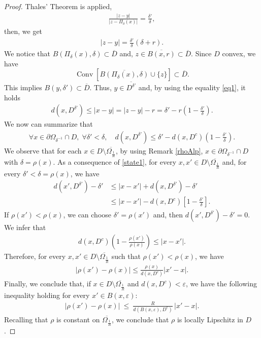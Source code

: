 \documentclass[reqno,11pt]{amsart}
\theoremstyle{definition}
\numberwithin{equation}{section}
\def\e{\varepsilon}
\def\ov{\overline}
\DeclareMathOperator{\conv}{Conv}
\newcommand{\1}{{{\bf 1}\kern-0,28em\rm l}}
\def\proj{\Pi}
\begin{document}
\begin{proof}
\noindent
Thales' Theorem is applied,
\begin{align*}
\frac{|z-y|}{|z- \proj_\delta (x)|}=\frac{\delta'}{\delta},
\end{align*}
then, we get 
\begin{align}
|z-y|=\frac{\delta'}{\delta} (\delta+r). \label{eq1}
\end{align}
We notice that $B(\proj_\delta (x),\delta) \subset \ov D$ and, $z\in \ov{B(x,r)} \subset \ov D$. Since $D$ convex,   we have 
$$\conv\left[\ov{B(\proj_\delta (x),\delta)}\cup\{z\} \right] \subset \ov D.$$
This implies $B(y,\delta')\subset \ov D$. Thus, $ y\in \ov{D^{\delta'}}$ and, by using the equality \eqref{eq1}, it holds
\begin{align*}
d(x,D^{\delta'})\le |x-y|=|z-y|-r=\delta'-r(1-\frac{\delta'}{\delta}).
\end{align*}
We now can summarize that 
\begin{align}
\forall x\in \partial\Omega_{\delta^{-1}}\cap D,\; \forall \delta'<\delta,\quad
d(x,D^{\delta'})\le \delta' - d(x, D^c)(1-\frac{\delta'}{\delta}).\label{state1}
\end{align}
We observe that for each $x\in D \setminus \ov{\Omega_{\frac 1R}}$, by using Remark \ref{rhoAlp}, $x\in \partial\Omega_{\delta^{-1}}\cap D$ with $\delta=\rho(x)$.
As a consequence of  \eqref{state1}, for every $x,x'\in D \setminus \ov{\Omega_{\frac 1R}}$ and, for every
$\delta' <\delta =\rho(x)$, we have
\begin{align*}
d(x',D^{\delta'})-\delta' &\le |x-x'| + d(x,D^{\delta'}) - \delta' \\
&\le |x-x'| - d(x, D^c) \left[ 1-\frac{\delta'}{\delta} \right].
\end{align*}
If $\rho(x') <\rho(x)$, we can choose $\delta'=\rho(x')$ and, then $d(x',D^{\delta'})-\delta'=0$. We infer that
\begin{align*}
d(x,D^c)\left( 1-\frac{\rho(x')}{\rho(x)} \right)\le |x-x'|.
\end{align*}
Therefore, for every $x,x'\in D\setminus \ov {\Omega_{\frac 1R}}$ such that $\rho(x') <\rho(x)$, we have
\begin{align*}
|\rho(x')-\rho(x)| \le \frac{\rho(x)}{d(x,D^c)}|x'-x|.
\end{align*}
Finally, we conclude that, if $x\in D\setminus \ov {\Omega_{\frac 1R}}$ and $d(x,D^c)<\e$, we have the following inequality holding for every $x'\in B(x,\e)$:
\begin{align}
|\rho(x')-\rho(x)|\ \le\ \frac{R}{d(B(x,\e),D^c)}\, |x'-x|.
\label{rhoLip}
\end{align}
Recalling that $\rho$ is constant on $\ov{\Omega_{\frac 1R}}$, we conclude that $\rho$ is locally Lipschitz  in $D$.


\end{proof}
\end{document}
